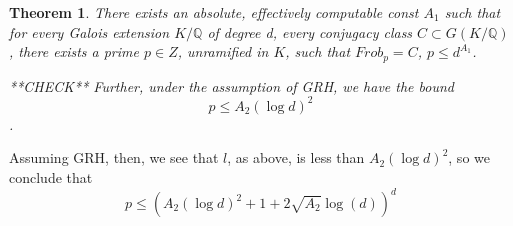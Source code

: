 \documentclass[12pt]{article}
\newtheorem{thm}{Theorem}[section]
\begin{document}
\begin{thm}
There exists an absolute, effectively computable const $A_1$ such that for every Galois extension $K/\mathbb{Q}$ of degree d, every conjugacy class $C \subset G(K/\mathbb{Q})$, there exists a prime $p \in Z$, unramified in $K$, such that $Frob_p = C$, $p \leq d^{A_1}$. 

**CHECK**
Further, under the assumption of GRH, we have the bound \[p \leq A_2 (\log d)^2 \].
\end{thm}

Assuming GRH, then, we see that $l$, as above, is less than $A_2 (\log d)^2$, so we conclude that
\[ p \leq (A_2 (\log d)^2 + 1 + 2\sqrt{A_2}\log(d))^d \]
\end{document}
